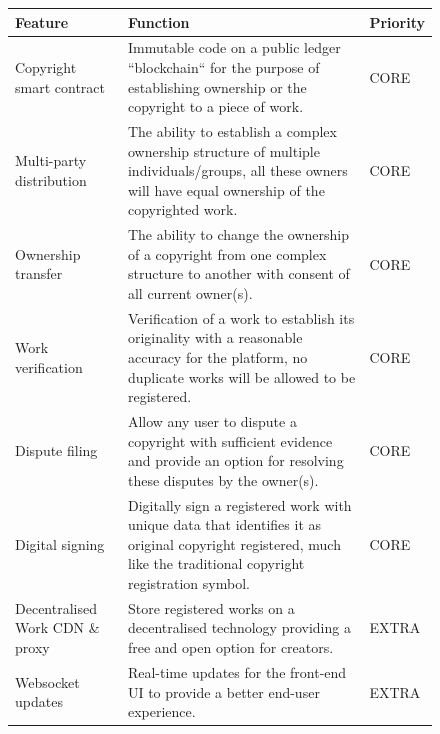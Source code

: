 \documentclass[12pt]{article}
\begin{document}
\begin{figure}[H]
\caption{Functional requirements}
\begin{table}[H]
\begin{tabular}{|p{}|p{}|p{}|}
\hline
Feature                         & Function                                                                                                                                                        & Priority \\ \hline
Copyright smart contract        & Immutable code on a public ledger “blockchain“ for the purpose of establishing ownership or the copyright to a piece of work.                                   & CORE     \\ \hline
Multi-party distribution        & The ability to establish a complex ownership structure of multiple individuals/groups, all these owners will have equal ownership of the copyrighted work.      & CORE     \\ \hline
Ownership transfer              & The ability to change the ownership of a copyright from one complex structure to another with consent of all current owner(s).                                  & CORE     \\ \hline
Work verification               & Verification of a work to establish its originality with a reasonable accuracy for the platform, no duplicate works will be allowed to be registered.           & CORE     \\ \hline
Dispute filing                  & Allow any user to dispute a copyright with sufficient evidence and provide an option for resolving these disputes by the owner(s).                              & CORE     \\ \hline
Digital signing                 & Digitally sign a registered work with unique data that identifies it as original copyright registered, much like the traditional copyright registration symbol. & CORE     \\ \hline
Decentralised Work CDN \& proxy & Store registered works on a decentralised technology providing a free and open option for creators.                                                             & EXTRA    \\ \hline
Websocket updates               & Real-time updates for the front-end UI to provide a better end-user experience.                                                                                 & EXTRA    \\ \hline
\end{tabular}
\end{table}
\end{figure}
\end{document}
